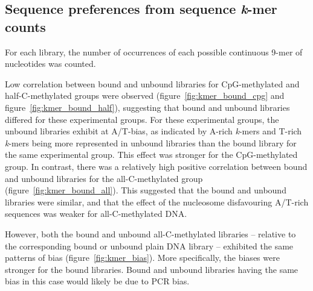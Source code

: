 \documentclass[parskip=full, numbers=noenddot]{scrreprt}
\begin{document}
\subsection{Sequence preferences from sequence \emph{k}-mer counts}
\label{ssec:nuseqpref_kmer}

For each library, the number of occurrences of each possible continuous 9-mer of nucleotides was counted.

Low correlation between bound and unbound libraries for CpG-methylated and half-C-methylated groups were observed (figure~\ref{fig:kmer_bound_cpg} and figure~\ref{fig:kmer_bound_half}), suggesting that bound and unbound libraries differed for these experimental groups.  For these experimental groups, the unbound libraries exhibit at A/T-bias, as indicated by A-rich \emph{k}-mers and T-rich \emph{k}-mers being more represented in unbound libraries than the bound library for the same experimental group.  This effect was stronger for the CpG-methylated group.  In contrast, there was a relatively high positive correlation between bound and unbound libraries for the all-C-methylated group (figure~\ref{fig:kmer_bound_all}).  This suggested that the bound and unbound libraries were similar, and that the effect of the nucleosome disfavouring A/T-rich sequences was weaker for all-C-methylated DNA.

However, both the bound and unbound all-C-methylated libraries -- relative to the corresponding bound or unbound plain DNA library -- exhibited the same patterns of bias (figure~\ref{fig:kmer_bias}).  More specifically, the biases were stronger for the bound libraries.  Bound and unbound libraries having the same bias in this case would likely be due to PCR bias.
\end{document}
